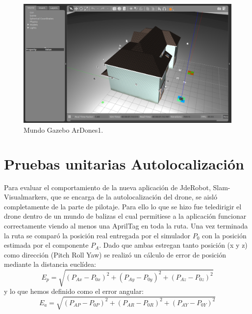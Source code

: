 \begin{figure}[H]
	\begin{center}
		\includegraphics[width=1\textwidth]{imag/IMG28.png}
				\caption{Mundo Gazebo ArDones1.}
		\label{fig:Mundo Gazebo.}	
	\end{center}
\end{figure}


\section{Pruebas unitarias Autolocalización}
\hspace{1cm} Para evaluar el comportamiento de la nueva aplicación de JdeRobot, Slam-Visualmarkers, que se encarga de la autolocalización del drone, se aisló completamente de la parte de pilotaje. Para ello lo que se hizo fue teledirigir el drone dentro de un mundo de balizas el cual permitiese a la aplicación funcionar correctamente viendo al menos una AprilTag en toda la ruta. Una vez terminada la ruta se comparó la posición real entregada por el simulador $P_{0}$ con la posición estimada por el componente $P_{A} $. Dado que ambas estregan tanto posición (x y z) como dirección (Pitch Roll Yaw) se realizó un cálculo de error de posición mediante la distancia euclídea: 
\[ E_{p} = \sqrt{(P_{Ax}-P_{0x})^{2}+(P_{Ay}-P_{0y})^{2}+(P_{Az}-P_{0z})^{2}}\]
y lo que hemos definido como el error angular:    
\[ E_{a} = \sqrt{(P_{AP}-P_{0P})^{2}+(P_{AR}-P_{0R})^{2}+(P_{AY}-P_{0Y})^{2}}\]


